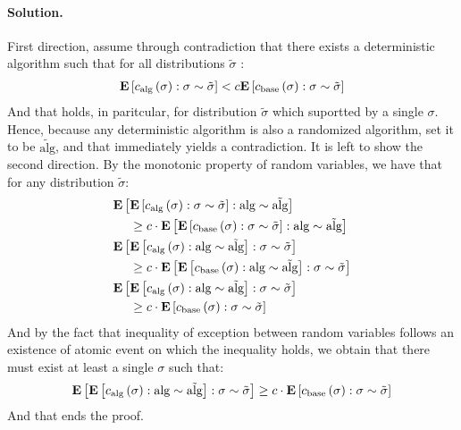 \documentclass{article}
\begin{document}
\begin{multicols*}{2}
  \paragraph{Solution.} First direction, assume through contradiction that there exists a deterministic algorithm such that for all distributions $\tilde{\sigma}$ :
  \begin{equation*}
    \begin{split}
      \dsig{  \calg\left( \sigma \right)  } < c \dsig{ \cbase \left( \sigma \right)  }
    \end{split}
  \end{equation*} And that holds, in paritcular, for distribution $\tilde{\sigma}$ which suportted by a single $\sigma$. Hence, because any deterministic algorithm is also a randomized algorithm, set it to be $ \tilde{\text{alg}}$, and that immediately yields a contradiction. 
  It is left to show the second direction. By the monotonic property of random variables, we have that for any distribution $\tilde{\sigma}$: 
  \begin{equation*}
    \begin{split}
      &  \dalg{ \dsig{ \calg\left( \sigma \right) } } \\
      & \ \  \ \ \ge c \cdot \dalg{ \dsig{  \cbase\left( \sigma \right) } } \\
      & \dsig{ \dalg{ \calg\left( \sigma \right) } } \\
      &  \ \  \ \ \ge c \cdot \dsig{ \dalg{  \cbase\left( \sigma \right) } } \\
      & \dsig{ \dalg{ \calg\left( \sigma \right) } } \\
      & \ \ \ \  \ge c \cdot \dsig{  \cbase\left( \sigma \right) }  
    \end{split}
  \end{equation*}
  And by the fact that inequality of exception between random variables follows an existence of atomic event on which the inequality holds, we obtain that there must exist at least a single $\sigma$ such that:
  \begin{equation*}
    \begin{split}
      \dsig{ \dalg{ \calg\left( \sigma \right) } } \ge c \cdot \dsig{  \cbase\left( \sigma \right) }  
    \end{split}
  \end{equation*}
  And that ends the proof.
\end{multicols*}
\printbibliography 
\end{document}
